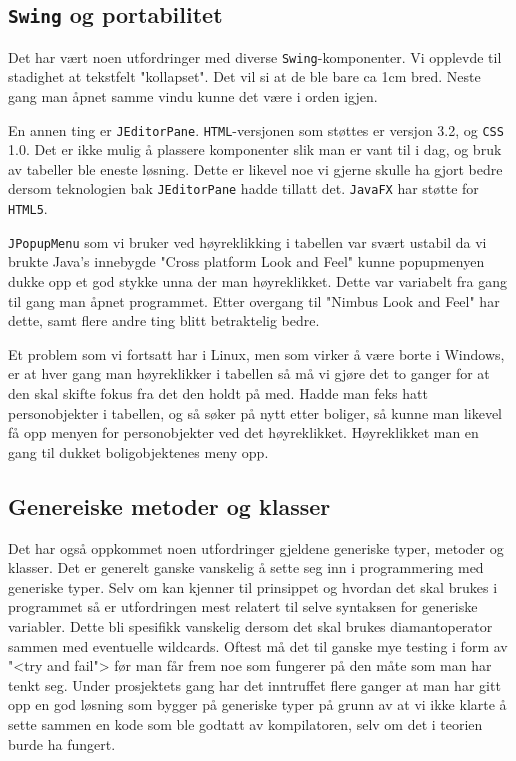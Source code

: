 \subsection{\texttt{Swing} og portabilitet} \label{subsec:portabilitet}
Det har vært noen utfordringer med diverse \texttt{Swing}-komponenter. Vi opplevde til stadighet at tekstfelt "kollapset". Det vil si at de ble bare ca 1cm bred. Neste gang man åpnet samme vindu kunne det være i orden igjen. 

En annen ting er \texttt{JEditorPane}. \texttt{HTML}-versjonen som støttes er versjon 3.2, og \texttt{CSS} 1.0. 
Det er ikke mulig å plassere komponenter slik man er vant til i dag, og bruk av tabeller ble eneste løsning. Dette er likevel noe vi gjerne skulle ha gjort bedre dersom teknologien bak \texttt{JEditorPane} hadde tillatt det. \texttt{JavaFX} har støtte for \texttt{HTML5}.

\texttt{JPopupMenu} som vi bruker ved høyreklikking i tabellen var svært ustabil da vi brukte Java's innebygde "Cross platform Look and Feel" kunne popupmenyen dukke opp et god stykke unna der man høyreklikket. Dette var variabelt fra gang til gang man åpnet programmet. Etter overgang til "Nimbus Look and Feel" har dette, samt flere andre ting blitt betraktelig bedre.

Et problem som vi fortsatt har i Linux, men som virker å være borte i Windows, er at hver gang man høyreklikker i tabellen så må vi gjøre det to ganger for at den skal skifte fokus fra det den holdt på med. Hadde man feks hatt personobjekter i tabellen, og så søker på nytt etter boliger, så kunne man likevel få opp menyen for personobjekter ved det høyreklikket. Høyreklikket man en gang til dukket boligobjektenes meny opp.

\subsection{Genereiske metoder og klasser}
Det har også oppkommet noen utfordringer gjeldene generiske typer, metoder og klasser. Det er generelt ganske vanskelig å sette seg inn i programmering med generiske typer. Selv om kan kjenner til prinsippet og hvordan det skal brukes i programmet så er utfordringen mest relatert til selve syntaksen for generiske variabler. Dette bli spesifikk vanskelig dersom det skal brukes diamantoperator sammen med eventuelle wildcards. Oftest må det til ganske mye testing i form av "<try and fail"> før man får frem noe som fungerer på den måte som man har tenkt seg. Under prosjektets gang har det inntruffet flere ganger at man har gitt opp en god løsning som bygger på generiske typer på grunn av at vi ikke klarte å sette sammen en kode som ble godtatt av kompilatoren, selv om det i teorien burde ha fungert.